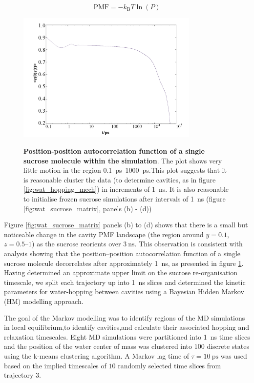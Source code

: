 \begin{equation}\label{eqn:pmf}
\mathrm{PMF}=-k_{\mathrm{B}} T \ln (P)
\end{equation}

\begin{figure}
    \centering
    \caption{\textbf{Position-position autocorrelation function of a single sucrose molecule within the simulation}. The plot shows very little motion in the region \SIrange{0.1}{1000}{\pico\second}.This plot suggests that it is reasonable cluster the data (to determine cavities, as in figure \ref{fig:wat_hopping_mech}) in increments of \SI{1}{\nano\second}. It is also reasonable to initialise frozen sucrose simulations after intervals of \SI{1}{\nano\second} (figure \ref{fig:wat_sucrose_matrix}, panels (b) - (d))}
    \includegraphics[width=0.8\textwidth]{chapters/water_hopping/figures/Fig_S8.png}
    \label{fig:wat_pos_pos_auto}
\end{figure}

Figure \ref{fig:wat_sucrose_matrix} panels (b) to (d) shows that there is a small but noticeable change in the cavity PMF landscape (the region around $y = 0.1$, $z = \numrange[range-phrase=-]{0.5}{1}$) as the sucrose reorients over $\SI{3}{\nano\second}$. This observation is consistent with analysis showing that the position–position autocorrelation function of a single sucrose molecule decorrelates after approximately \SI{1}{\nano\second}, as presented in figure \ref{fig:wat_pos_pos_auto}. Having determined an approximate upper limit on the sucrose re-organisation timescale, we split each trajectory up into \SI{1}{\nano\second} slices and determined the kinetic parameters for water-hopping between cavities using a Bayesian Hidden Markov (HM) modelling approach. 

The goal of the Markov modelling was to identify regions of the MD simulations in local equilibrium,to identify cavities,and calculate their associated hopping and relaxation timescales. Eight MD simulations were partitioned into \SI{1}{\nano\second} time slices and the position of the water center of mass was clustered into $100$ discrete states using the k-means clustering algorithm. A Markov lag time of $\tau = \SI{10}{\pico\second}$ was used based on the implied timescales of $10$ randomly selected time slices from trajectory $3$.  %

